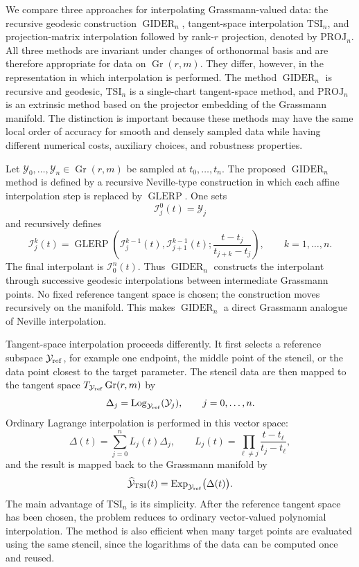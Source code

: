 \documentclass[a4paper,11pt]{article}
\newcommand{\Log}{\operatorname{Log}}
\newcommand{\Exp}{\operatorname{Exp}}
\DeclareMathOperator{\Gr}{Gr}
\newcommand{\GLERP}{\operatorname{GLERP}}
\newcommand{\GIDER}{\operatorname{GIDER}}
\numberwithin{equation}{section}
\theoremstyle{plain}
\theoremstyle{definition}
\theoremstyle{remark}
\begin{document}
We compare three approaches for interpolating Grassmann-valued data: the recursive geodesic construction \(\GIDER_n\), tangent-space interpolation \(\mathrm{TSI}_n\), and projection-matrix interpolation followed by rank-\(r\) projection, denoted by \(\mathrm{PROJ}_n\).  All three methods are invariant under changes of orthonormal basis and are therefore appropriate for data on \(\Gr(r,m)\).  They differ, however, in the representation in which interpolation is performed.  The method \(\GIDER_n\) is recursive and geodesic, \(\mathrm{TSI}_n\) is a single-chart tangent-space method, and \(\mathrm{PROJ}_n\) is an extrinsic method based on the projector embedding of the Grassmann manifold.  The distinction is important because these methods may have the same local order of accuracy for smooth and densely sampled data while having different numerical costs, auxiliary choices, and robustness properties.

Let \(\mathcal{Y}_0,\ldots,\mathcal{Y}_n\in\Gr(r,m)\) be sampled at \(t_0,\ldots,t_n\).  The proposed \(\GIDER_n\) method is defined by a recursive Neville-type construction in which each affine interpolation step is replaced by \(\GLERP\).  One sets
\[
    \mathcal{I}_j^0(t)=\mathcal{Y}_j
\]
and recursively defines
\[
    \mathcal{I}_j^k(t)
    =
    \GLERP\left(
        \mathcal{I}_j^{k-1}(t),
        \mathcal{I}_{j+1}^{k-1}(t);
        \frac{t-t_j}{t_{j+k}-t_j}
    \right),
    \qquad k=1,\ldots,n.
\]
The final interpolant is \(\mathcal{I}_0^n(t)\).  Thus \(\GIDER_n\) constructs the interpolant through successive geodesic interpolations between intermediate Grassmann points.  No fixed reference tangent space is chosen; the construction moves recursively on the manifold.  This makes \(\GIDER_n\) a direct Grassmann analogue of Neville interpolation.

Tangent-space interpolation proceeds differently.  It first selects a reference subspace \(\mathcal{Y}_{\rm ref}\), for example one endpoint, the middle point of the stencil, or the data point closest to the target parameter.  The stencil data are then mapped to the tangent space \(T_{\mathcal{Y}_{\rm ref}}\Gr(r,m)\) by
\[
    \Delta_j=\Log_{\mathcal{Y}_{\rm ref}}(\mathcal{Y}_j),
    \qquad j=0,\ldots,n.
\]
Ordinary Lagrange interpolation is performed in this vector space:
\[
    \Delta(t)=\sum_{j=0}^n L_j(t)\Delta_j,
    \qquad
    L_j(t)=\prod_{\ell\ne j}\frac{t-t_\ell}{t_j-t_\ell},
\]
and the result is mapped back to the Grassmann manifold by
\[
    \widehat{\mathcal{Y}}_{\rm TSI}(t)
    =
    \Exp_{\mathcal{Y}_{\rm ref}}\bigl(\Delta(t)\bigr).
\]
The main advantage of \(\mathrm{TSI}_n\) is its simplicity.  After the reference tangent space has been chosen, the problem reduces to ordinary vector-valued polynomial interpolation.  The method is also efficient when many target points are evaluated using the same stencil, since the logarithms of the data can be computed once and reused.
\end{document}
